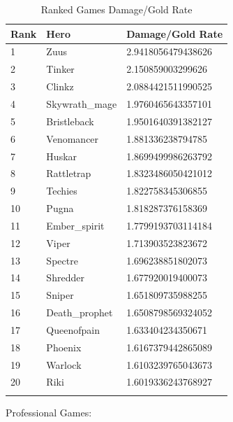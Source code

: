 \documentclass{article}
\begin{document}
\begin{longtable}{|p{2.5cm}|p{2.5cm}|p{5.5cm}|}

\hline
\textbf{Rank} & \textbf{Hero} & \textbf{Damage/Gold Rate} \\
\hline
\endhead

1 & Zuus & 2.9418056479438626 \\\hline
2 & Tinker & 2.150859003299626 \\\hline
3 & Clinkz & 2.0884421511990525 \\\hline
4 & Skywrath\_mage & 1.9760465643357101 \\\hline
5 & Bristleback & 1.9501640391382127 \\\hline
6 & Venomancer & 1.881336238794785 \\\hline
7 & Huskar & 1.8699499986263792 \\\hline
8 & Rattletrap & 1.8323486050421012 \\\hline
9 & Techies & 1.822758345306855 \\\hline
10 & Pugna & 1.818287376158369 \\\hline
11 & Ember\_spirit & 1.7799193703114184 \\\hline
12 & Viper & 1.713903523823672 \\\hline
13 & Spectre & 1.696238851802073 \\\hline
14 & Shredder & 1.677920019400073 \\\hline
15 & Sniper & 1.651809735988255 \\\hline
16 & Death\_prophet & 1.6508798569324052 \\\hline
17 & Queenofpain & 1.633404234350671 \\\hline
18 & Phoenix & 1.6167379442865089 \\\hline
19 & Warlock & 1.6103239765043673 \\\hline
20 & Riki & 1.6019336243768927 \\\hline

\caption{Ranked Games Damage/Gold Rate}
\label{ranked-games-damage-gold-rate}
\end{longtable}

Professional Games:
\end{document}
